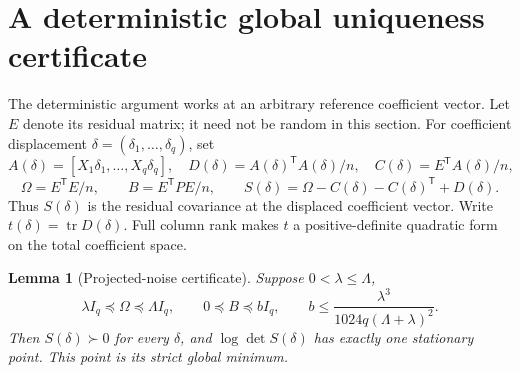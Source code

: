 \documentclass[11pt]{article}
\newtheorem{lemma}[theorem]{Lemma}
\newcommand{\tr}{\operatorname{tr}}
\begin{document}
\section{A deterministic global uniqueness certificate}

The deterministic argument works at an arbitrary reference coefficient
vector. Let \(E\) denote its residual matrix; it need not be random
in this section. For coefficient displacement
\(\delta=(\delta_1,\ldots,\delta_q)\), set
\[
 A(\delta)=[X_1\delta_1,\ldots,X_q\delta_q],\quad
 D(\delta)=A(\delta)^{\mathsf T}A(\delta)/n,\quad
 C(\delta)=E^{\mathsf T}A(\delta)/n,
\]
\[
 \Omega=E^{\mathsf T}E/n,\qquad B=E^{\mathsf T}PE/n,\qquad
 S(\delta)=\Omega-C(\delta)-C(\delta)^{\mathsf T}+D(\delta).
 \tag{3}
\]
Thus \(S(\delta)\) is the residual covariance at the displaced
coefficient vector. Write \(t(\delta)=\tr D(\delta)\).
Full column rank makes \(t\) a positive-definite quadratic form on
the total coefficient space.

\begin{lemma}[Projected-noise certificate]\label{lem:certificate}
Suppose \(0<\lambda\leq\Lambda\),
\[
 \lambda I_q\preceq\Omega\preceq\Lambda I_q,\qquad
 0\preceq B\preceq b I_q,\qquad
 b\leq\frac{\lambda^3}{1024q(\Lambda+\lambda)^2}.
 \tag{4}
\]
Then \(S(\delta)\succ0\) for every \(\delta\), and
\(\log\det S(\delta)\) has exactly one stationary point. This
point is its strict global minimum.
\end{lemma}
\end{document}
